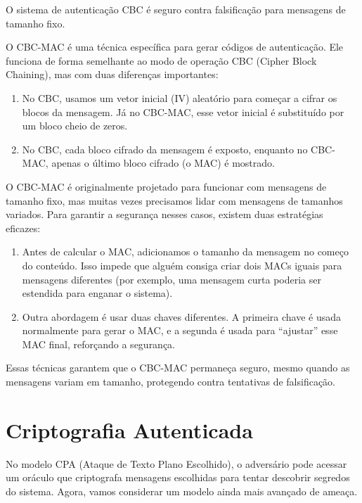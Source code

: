 \begin{theorem}
  O sistema de autenticação CBC é seguro contra falsificação para mensagens de tamanho fixo.
\end{theorem}

O CBC-MAC é uma técnica específica para gerar códigos de autenticação.
Ele funciona de forma semelhante ao modo de operação CBC (Cipher Block Chaining), mas com duas diferenças importantes:

\begin{enumerate}
\item No CBC, usamos um vetor inicial (IV) aleatório para começar a cifrar os blocos da mensagem.
  Já no CBC-MAC, esse vetor inicial é substituído por um bloco cheio de zeros.
\item No CBC, cada bloco cifrado da mensagem é exposto, enquanto no CBC-MAC, apenas o último bloco cifrado (o MAC) é mostrado.
\end{enumerate}

O CBC-MAC é originalmente projetado para funcionar com mensagens de tamanho fixo, mas muitas vezes precisamos lidar com mensagens de tamanhos variados.
Para garantir a segurança nesses casos, existem duas estratégias eficazes:

\begin{enumerate}
\item Antes de calcular o MAC, adicionamos o tamanho da mensagem no começo do conteúdo.
  Isso impede que alguém consiga criar dois MACs iguais para mensagens diferentes (por exemplo, uma mensagem curta poderia ser estendida para enganar o sistema).
\item Outra abordagem é usar duas chaves diferentes.
  A primeira chave é usada normalmente para gerar o MAC, e a segunda é usada para ``ajustar'' esse MAC final, reforçando a segurança.
\end{enumerate}

Essas técnicas garantem que o CBC-MAC permaneça seguro, mesmo quando as mensagens variam em tamanho, protegendo contra tentativas de falsificação.


\section{Criptografia Autenticada}
\label{label}

No modelo CPA (Ataque de Texto Plano Escolhido), o adversário pode acessar um oráculo que criptografa mensagens escolhidas para tentar descobrir segredos do sistema.
Agora, vamos considerar um modelo ainda mais avançado de ameaça.

